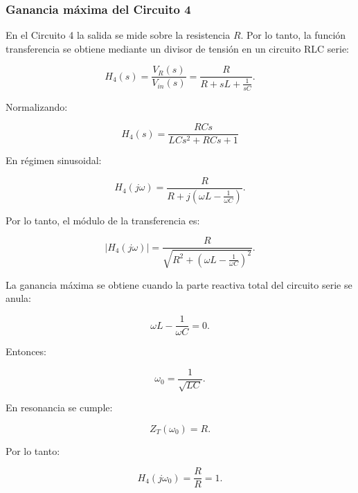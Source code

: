 \subsubsection{Ganancia máxima del Circuito 4}

En el Circuito 4 la salida se mide sobre la resistencia \(R\). Por lo tanto, la función transferencia se obtiene mediante un divisor de tensión en un circuito RLC serie:

\begin{equation}
    H_4(s)=\frac{V_R(s)}{V_{in}(s)}
    =
    \frac{R}{R+sL+\frac{1}{sC}}.
\end{equation}

Normalizando:

\begin{equation}
    \boxed{
    H_4(s)=
    \frac{RCs}{LCs^2+RCs+1}
    }
\end{equation}

En régimen sinusoidal:

\begin{equation}
    H_4(j\omega)=
    \frac{R}
    {R+j\left(\omega L-\frac{1}{\omega C}\right)}.
\end{equation}

Por lo tanto, el módulo de la transferencia es:

\begin{equation}
    |H_4(j\omega)|=
    \frac{R}
    {
    \sqrt{
    R^2+
    \left(\omega L-\frac{1}{\omega C}\right)^2
    }
    }.
\end{equation}

La ganancia máxima se obtiene cuando la parte reactiva total del circuito serie se anula:

\begin{equation}
    \omega L-\frac{1}{\omega C}=0.
\end{equation}

Entonces:

\begin{equation}
    \omega_0=\frac{1}{\sqrt{LC}}.
\end{equation}

En resonancia se cumple:

\begin{equation}
    Z_T(\omega_0)=R.
\end{equation}

Por lo tanto:

\begin{equation}
    H_4(j\omega_0)=\frac{R}{R}=1.
\end{equation}

